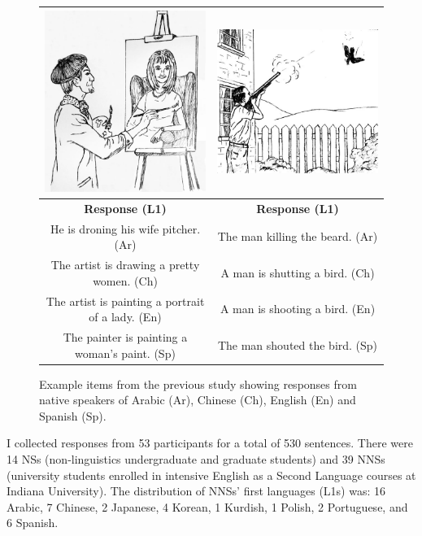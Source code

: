 \begin{figure}[htb!]
\begin{center}
\begin{tabular}{|c||c|}
\hline
\includegraphics[width=0.40\columnwidth]{figures/exampleprompt.jpg} & \includegraphics[width=0.40\columnwidth]{figures/exampleprompt2.jpg}\\
\hline
\textbf{Response (L1)} & \textbf{Response (L1)} \\
\hline
He is droning his wife pitcher. (Ar) & The man killing the beard. (Ar) \\
\hline
The artist is drawing a pretty women. (Ch) & A man is shutting a bird. (Ch) \\
\hline
The artist is painting a portrait of a lady. (En) & A man is shooting a bird. (En) \\
\hline
The painter is painting a woman's paint. (Sp) & The man shouted the bird. (Sp)\\
\hline
\end{tabular}
\end{center}
\caption{Example items from the previous study showing responses from native speakers of Arabic (Ar), Chinese (Ch), English (En) and Spanish (Sp).}
\label{fig:example-picture}
\end{figure}

I collected responses from 53 participants for a total of 530 sentences. There were 14 NSs (non-linguistics undergraduate and graduate students) and 39 NNSs (university students enrolled in intensive English as a Second Language courses at Indiana University). The distribution of NNSs' first languages (L1s) was: 16 Arabic, 7 Chinese, 2 Japanese, 4 Korean, 1 Kurdish, 1 Polish, 2 Portuguese, and 6 Spanish.

